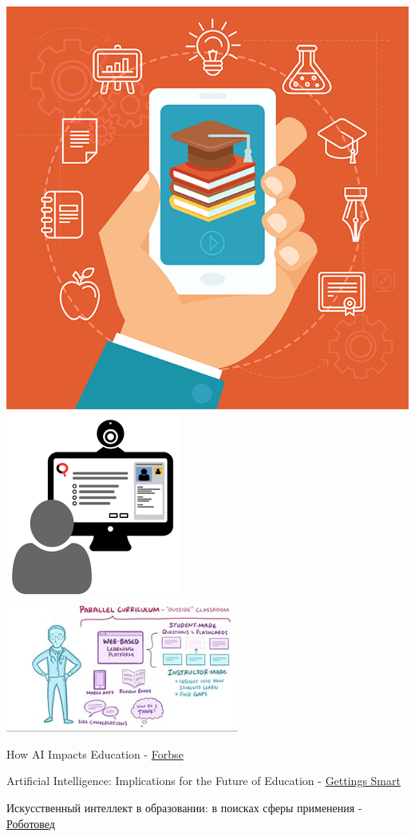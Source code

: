 \documentclass[default]{beamer}
\begin{document}
\begin{frame}
		\begin{center}
			\includegraphics[height=0.2\textheight]{techno.png}
			\includegraphics[height=0.2\textheight]{proctoring.png}
			\includegraphics[height=0.2\textheight]{adaptive.jpg}
		\end{center}
		
		\begin{tiny}
			\color{blue}
			How AI Impacts Education - \href{https://www.forbes.com/sites/theyec/2017/12/27/how-ai-impacts-education}{Forbse}
			
			Artificial Intelligence: Implications for the Future of Education - \href{http://www.gettingsmart.com/2018/01/artificial-intelligence-implications-for-the-future-of-education/}{Gettings Smart}
			
			Искусственный интеллект в образовании: в поисках сферы применения - \href{http://robotoved.ru/ai_education_russia/}{Роботовед}
		\end{tiny}
	\end{frame}
	
\end{document}
